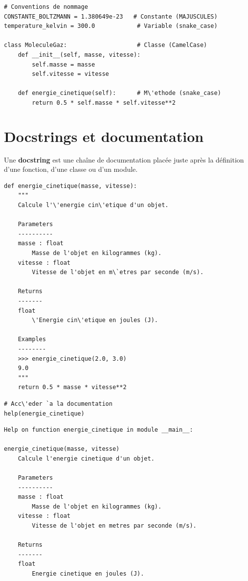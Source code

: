 \begin{codeblock}[title=\textbf{Python}]
\begin{verbatim}
# Conventions de nommage
CONSTANTE_BOLTZMANN = 1.380649e-23   # Constante (MAJUSCULES)
temperature_kelvin = 300.0            # Variable (snake_case)

class MoleculeGaz:                    # Classe (CamelCase)
    def __init__(self, masse, vitesse):
        self.masse = masse
        self.vitesse = vitesse

    def energie_cinetique(self):      # M\'ethode (snake_case)
        return 0.5 * self.masse * self.vitesse**2
\end{verbatim}
\end{codeblock}

\section{Docstrings et documentation}

Une \textbf{docstring} est une cha\^ine de documentation plac\'ee juste apr\`es la
d\'efinition d'une fonction, d'une classe ou d'un module.

\begin{codeblock}[title=\textbf{Python}]
\begin{verbatim}
def energie_cinetique(masse, vitesse):
    """
    Calcule l'\'energie cin\'etique d'un objet.

    Parameters
    ----------
    masse : float
        Masse de l'objet en kilogrammes (kg).
    vitesse : float
        Vitesse de l'objet en m\`etres par seconde (m/s).

    Returns
    -------
    float
        \'Energie cin\'etique en joules (J).

    Examples
    --------
    >>> energie_cinetique(2.0, 3.0)
    9.0
    """
    return 0.5 * masse * vitesse**2
\end{verbatim}
\end{codeblock}

\begin{codeblock}[title=\textbf{Python}]
\begin{verbatim}
# Acc\'eder `a la documentation
help(energie_cinetique)
\end{verbatim}
\end{codeblock}

\begin{codeoutput}
\begin{verbatim}
Help on function energie_cinetique in module __main__:

energie_cinetique(masse, vitesse)
    Calcule l'energie cinetique d'un objet.

    Parameters
    ----------
    masse : float
        Masse de l'objet en kilogrammes (kg).
    vitesse : float
        Vitesse de l'objet en metres par seconde (m/s).

    Returns
    -------
    float
        Energie cinetique en joules (J).
\end{verbatim}
\end{codeoutput}

